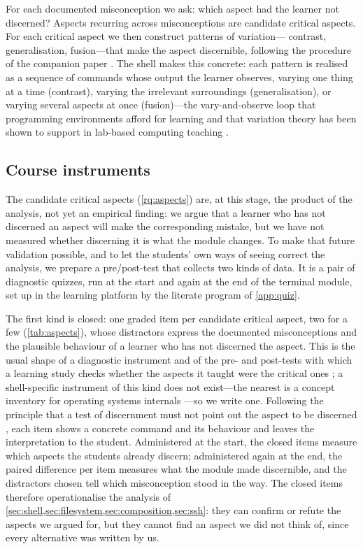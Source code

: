 For each documented misconception we ask: which aspect had the learner not
discerned?
Aspects recurring across misconceptions are candidate critical aspects.
For each critical aspect we then construct patterns of variation---%
contrast, generalisation, fusion---that make the aspect discernible,
following the procedure of the companion paper
\autocite{VTProgMisconceptions}.
The shell makes this concrete: each pattern is realised as a sequence of
commands whose output the learner observes, varying one thing at a time
(contrast), varying the irrelevant surroundings (generalisation), or
varying several aspects at once (fusion)---the vary-and-observe loop that
programming environments afford for learning
\autocite{Svensson2020Affordances} and that variation theory has been shown
to support in lab-based computing teaching
\autocite{ThuneEckerdal2009Variation,ThuneEckerdal2018Lab}.

\subsection{Course instruments}
\label{sec:instruments}

The candidate critical aspects (\cref{rq:aspects}) are, at this stage, the
product of the analysis, not yet an empirical finding: we argue that a
learner who has not discerned an aspect will make the corresponding
mistake, but we have not measured whether discerning it is what the module
changes.
To make that future validation possible, and to let the students' own
ways of seeing correct the analysis, we prepare a pre/post-test that
collects two kinds of data.
It is a pair of diagnostic quizzes, run at the start and again at the end
of the terminal module, set up in the learning platform by the literate
program of \cref{app:quiz}.

The first kind is closed: one graded item per candidate critical
aspect, two for a few (\cref{tab:aspects}),
whose distractors express the documented misconceptions and the plausible
behaviour of a learner who has not discerned the aspect.
This is the usual shape of a diagnostic instrument
\autocite{KaltakciGurel2015Diagnostics} and of the pre- and post-tests
with which a learning study checks whether the aspects it taught were the
critical ones \autocite[Ch.~7]{NCOL}; a shell-specific instrument of this
kind does not exist---the nearest is a concept inventory for operating
systems internals \autocite{WebbTaylor2014OSCI}---so we write one.
Following the principle that a test of discernment must not point out
the aspect to be discerned \autocite[p.~91]{NCOL}, each item shows a
concrete command and its behaviour and leaves the interpretation to the
student.
Administered at the start, the closed items measure which aspects the
students already discern; administered again at the end, the paired
difference per item measures what the module made discernible, and the
distractors chosen tell which misconception stood in the way.
The closed items therefore operationalise the analysis of
\cref{sec:shell,sec:filesystem,sec:composition,sec:ssh}: they can
confirm or refute the aspects we argued for, but they cannot find an
aspect we did not think of, since every alternative was written by us.

